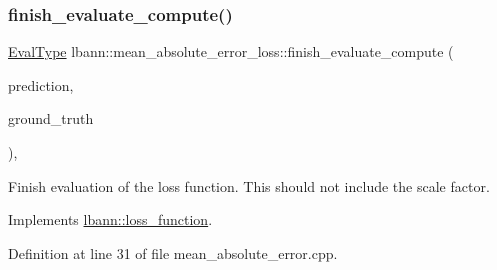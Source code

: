 \subsubsection{\texorpdfstring{finish\+\_\+evaluate\+\_\+compute()}{finish\_evaluate\_compute()}}
{\footnotesize\ttfamily \hyperlink{base_8hpp_a3266f5ac18504bbadea983c109566867}{Eval\+Type} lbann\+::mean\+\_\+absolute\+\_\+error\+\_\+loss\+::finish\+\_\+evaluate\+\_\+compute (\begin{DoxyParamCaption}\item[{const \hyperlink{base_8hpp_a9a697a504ae84010e7439ffec862b470}{Abs\+Dist\+Mat} \&}]{prediction,  }\item[{const \hyperlink{base_8hpp_a9a697a504ae84010e7439ffec862b470}{Abs\+Dist\+Mat} \&}]{ground\+\_\+truth }\end{DoxyParamCaption})\hspace{0.3cm}{\ttfamily [override]}, {\ttfamily [virtual]}}

Finish evaluation of the loss function. This should not include the scale factor. 

Implements \hyperlink{classlbann_1_1loss__function_a3ea8553a4e9c75477d7d4fc533c4d4fd}{lbann\+::loss\+\_\+function}.



Definition at line 31 of file mean\+\_\+absolute\+\_\+error.\+cpp.


